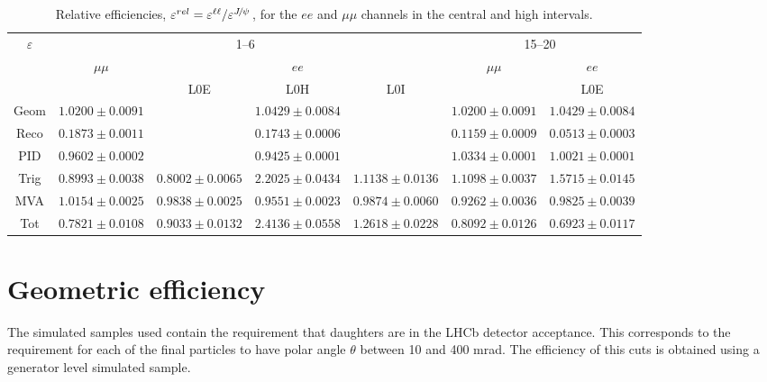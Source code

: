 \begin{landscape}
\begin{table}
\centering
\caption{Relative efficiencies, $\varepsilon^{rel} = \varepsilon^{\ell\ell} / \varepsilon^{\jpsi}$,
for the $ee$ and $\mu\mu$ channels in the central and high \qsq intervals.}
\begin{tabular}{|c|c|c|c|c|c|c|}
\hline \multirow{3}{*}{$\varepsilon$}  			&  \multicolumn{4}{c|}{1--6~\gevgevcccc}  				& \multicolumn {2}{c|}{15--20~\gevgevcccc}  \\ \cline{2-7}
 				&	  $\mu\mu$  				& \multicolumn {3}{c|}{$ee$} 			&  $\mu\mu$  				& \multicolumn {1}{c|}{$ee$} \\ \cline{2-7}
				&   &  L0E 	& L0H 	& L0I    &  	& L0E 	\\ \hline
Geom  & $ 1.0200 \pm 0.0091$ & \multicolumn{3}{c|}{$ 1.0429 \pm 0.0084$} & $ 1.0200 \pm 0.0091$ & \multicolumn{1}{c|}{$ 1.0429 \pm 0.0084$} \\
Reco  & $ 0.1873 \pm 0.0011$ & \multicolumn{3}{c|}{$ 0.1743 \pm 0.0006$} & $ 0.1159 \pm 0.0009$ & \multicolumn{1}{c|}{$ 0.0513 \pm 0.0003$} \\
PID  & $ 0.9602 \pm 0.0002$ & \multicolumn{3}{c|}{$ 0.9425 \pm 0.0001$} & $ 1.0334 \pm 0.0001$ & \multicolumn{1}{c|}{$ 1.0021 \pm 0.0001$} \\
\hline
Trig  & $ 0.8993 \pm 0.0038 $ & $ 0.8002 \pm 0.0065 $ & $ 2.2025 \pm 0.0434 $ & $ 1.1138 \pm 0.0136 $ & $ 1.1098 \pm 0.0037 $ & $ 1.5715 \pm 0.0145 $ \\ 
MVA  & $ 1.0154 \pm 0.0025 $ & $ 0.9838 \pm 0.0025 $ & $ 0.9551 \pm 0.0023 $ & $ 0.9874 \pm 0.0060 $ & $ 0.9262 \pm 0.0036 $ & $ 0.9825 \pm 0.0039 $ \\  
\hline
Tot  & $ 0.7821 \pm 0.0108 $ & $ 0.9033 \pm 0.0132 $ & $ 2.4136 \pm 0.0558 $ & $ 1.2618 \pm 0.0228 $ & $ 0.8092 \pm 0.0126 $ & $ 0.6923 \pm 0.0117 $ \\  
\hline
\end{tabular}\label{tab:RKst_releff}
\end{table}

\end{landscape}


\section{Geometric efficiency}


The simulated samples used contain the requirement that daughters are in the LHCb
detector acceptance. This corresponds to the requirement for each of the final particles
to have polar angle $\theta$ between 10 and 400 mrad. The efficiency of this
cuts is obtained using a generator level simulated sample.

